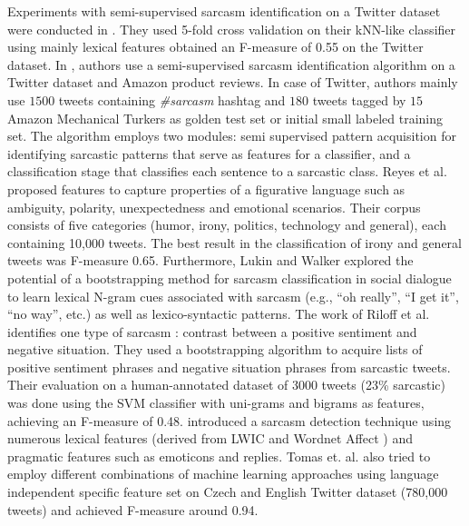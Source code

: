 Experiments with semi-supervised sarcasm identification on a Twitter dataset were conducted in \cite{davidov10}. They used 5-fold cross validation on their kNN-like classifier using mainly lexical features obtained an F-measure of 0.55 on the Twitter dataset. In \cite{davidov10}, authors use a semi-supervised sarcasm identification algorithm on a Twitter dataset and Amazon product reviews. In case of Twitter, authors mainly use $1500$ tweets containing \textit{\#sarcasm} hashtag and $180$ tweets tagged by $15$ Amazon Mechanical Turkers \cite{mturk} as golden test set or initial small labeled training set. The algorithm employs two modules: semi supervised pattern acquisition for identifying sarcastic patterns that serve as features for a classifier, and a classification stage that classifies each sentence to a sarcastic class. Reyes et al. \cite{reyes12} proposed features to capture properties of a figurative language such as ambiguity, polarity, unexpectedness and emotional scenarios. Their corpus consists of five categories (humor, irony, politics, technology and general), each containing 10,000 tweets. The best result in the classification of irony and general tweets was F-measure 0.65. Furthermore, Lukin and Walker \cite{Lukin_really13} explored the potential of a bootstrapping method for sarcasm classification in social dialogue to learn lexical N-gram cues associated with sarcasm (e.g., “oh really”, “I get it”, “no way”, etc.) as well as lexico-syntactic patterns. The work of Riloff et al. \cite{riloff13} identifies one type of sarcasm : contrast between a positive sentiment and negative situation. They used a bootstrapping algorithm to acquire lists of positive sentiment phrases and negative situation phrases from sarcastic tweets. Their evaluation on a human-annotated dataset of 3000 tweets (23\% sarcastic) was done using the SVM classifier with uni-grams and bigrams as features, achieving an F-measure of 0.48. \cite{gonzalez_acl} introduced a sarcasm detection technique using numerous lexical features (derived from LWIC \cite{pennebaker01} and Wordnet Affect \cite{valitutti04wordnet}) and pragmatic features such as emoticons and replies. Tomas et. al. \cite{tomas14} also tried to employ different combinations of machine learning approaches using language independent specific feature set on Czech and English Twitter dataset (780,000 tweets) and achieved F-measure around 0.94.